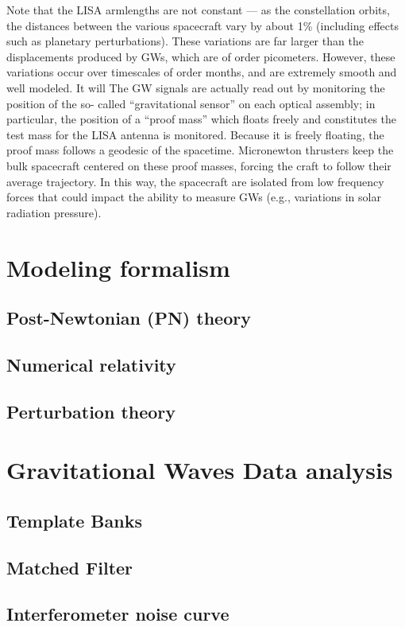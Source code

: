 \documentclass[binding=0.6cm, LaM]{sapthesis}
\begin{document}
Note that the LISA armlengths are not constant — as the constellation orbits, the distances between the various spacecraft vary by about 1\% (including effects such as planetary perturbations). 
These variations are far larger than the displacements produced by GWs, which are of order picometers. 
However, these variations occur over timescales of order months, and are extremely smooth and well modeled. It will
 The GW signals are actually read out by monitoring the position of the so- called “gravitational sensor” on each optical assembly; in particular, the position of a “proof mass” which floats freely
 and constitutes the test mass for the LISA antenna is monitored. Because it is freely floating, the proof mass follows a geodesic of the spacetime. 
Micronewton thrusters keep the bulk spacecraft centered on these proof masses, forcing the craft to follow their average trajectory. 
In this way, the spacecraft are isolated from low frequency forces that could impact the ability to measure GWs (e.g., variations in solar radiation pressure).

\chapter{Modeling formalism}
\section{Post-Newtonian (PN) theory}
\section{Numerical relativity}
\section{Perturbation theory}


\chapter{Gravitational Waves Data analysis}
\section{Template Banks}
\section{Matched Filter}
\section{Interferometer noise curve}
\end{document}
